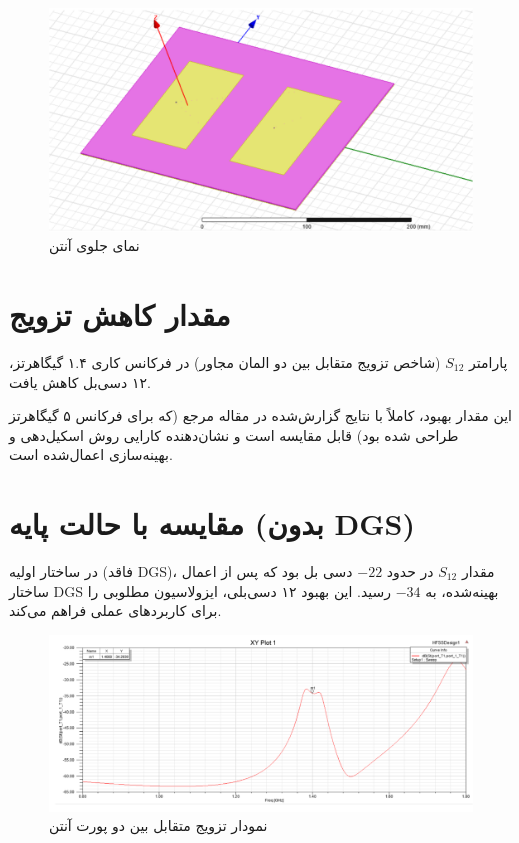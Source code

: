   \begin{figure}
 	\centering
 	\includegraphics[scale=0.5]{Images/fig30.png}
 	\caption{نمای جلوی آنتن}
 	\label{fig30}
 \end{figure}
 
 
 \section{مقدار کاهش تزویج}
 
 پارامتر
 $S_{12}$
   (شاخص تزویج متقابل بین دو المان مجاور) در فرکانس کاری ۱.۴ گیگاهرتز، ۱۲ دسی‌بل کاهش یافت.
   
   
 این مقدار بهبود، کاملاً با نتایج گزارش‌شده در مقاله مرجع
 \cite{hajilou2012mutual}
 (که برای فرکانس ۵ گیگاهرتز طراحی شده بود) قابل مقایسه است و نشان‌دهنده کارایی روش اسکیل‌دهی و بهینه‌سازی اعمال‌شده است.
 
 \section{مقایسه با حالت پایه (بدون DGS)}
 در ساختار اولیه (فاقد DGS)، مقدار 
 $S_{12}$
 در حدود 
 $-22$
  دسی بل بود که پس از اعمال ساختار DGS بهینه‌شده، به 
  $-34$
    رسید. این بهبود ۱۲ دسی‌بلی، ایزولاسیون مطلوبی را برای کاربردهای عملی فراهم می‌کند.
\begin{figure}
	\centering
	\includegraphics[scale=0.5]{Images/fig31.png}
	\caption{نمودار تزویج متقابل بین دو پورت آنتن}
	\label{fig31}
\end{figure}
    
